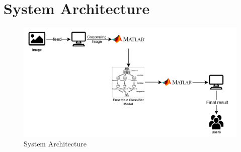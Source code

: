 \section{System Architecture}
\begin{figure}[H]
    \includegraphics[width=160mm]{./img/architecture.png}
    \caption{System Architecture}
\end{figure}